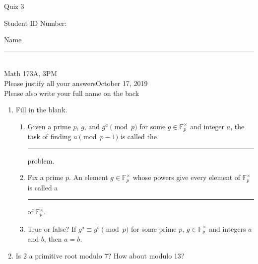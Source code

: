 \documentclass[12pt]{article}
\begin{document}
\begin{flushleft} 
\centerline{\LARGE{Quiz 3}} 
\vspace{5 mm}
{Student ID Number:}\hfill  
{Name \rule {2 in}{0.01in}}\\
Math 173A, 3PM
\\
{Please justify all your answers}\hfill {October 17, 2019}
\\
{Please also write your full name on the back} 

\medskip
\end{flushleft}

\begin{enumerate}
	\item Fill in the blank.
	\begin{enumerate}
		\item Given a prime $p$, $g$, and $g^a \pmod{p}$ for some $g\in \mathbb{F}_p^\times$ and integer $a$, the task of finding $a \pmod{p-1}$ is called the \rule{3.5cm}{.15mm} problem.

		\item Fix a prime $p$. An element $g\in \mathbb{F}_p^\times$ whose powers give every element of $\mathbb{F}_p^\times$ is called a \rule{3.5cm}{.155mm} of $\mathbb{F}_p^\times$.

		\item True or false? If $g^a \equiv g^b \pmod{p}$ for some prime $p$, $g\in \mathbb{F}_p^\times$ and integers $a$ and $b$, then $a = b$.

	\end{enumerate}

	\item Is $2$ a primitive root modulo 7? How about modulo 13?
	\vfill
\end{enumerate}

\end{document}
